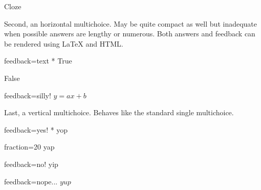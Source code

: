 \documentclass[twocolumn]{article}
\begin{document}
\begin{quiz}
\begin{cloze}{Cloze}
\begin{multi}[horizontal]
Second, an horizontal multichoice. May be quite compact as well but inadequate 
when possible answers are lengthy or numerous. Both answers and feedback can 
be rendered using LaTeX and HTML.
\item[feedback={text}]* True
\item[] False
\item[feedback={silly!}] $y=ax+b$
\end{multi}

\begin{multi}[vertical]
Last, a vertical multichoice. Behaves like the standard single multichoice.
\item[feedback={yes!}]* yop
\item[fraction=20] yap
\item[feedback={no!}] yip
\item[feedback={nope...}] $yup$
\end{multi}
\end{cloze}

\end{quiz}

\end{document}
